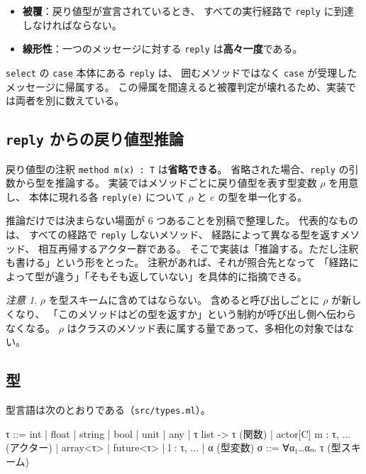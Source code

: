 \documentclass[11pt,a4paper]{ltjsarticle}
\theoremstyle{definition}
\theoremstyle{remark}
\newtheorem{remark}[theorem]{注意}
\begin{document}
\begin{itemize}
\item \textbf{被覆}：戻り値型が宣言されているとき、
      すべての実行経路で \texttt{reply} に到達しなければならない。
\item \textbf{線形性}：一つのメッセージに対する \texttt{reply} は\textbf{高々一度}である。
\end{itemize}

\texttt{select} の \texttt{case} 本体にある \texttt{reply} は、
囲むメソッドではなく \texttt{case} が受理したメッセージに帰属する。
この帰属を間違えると被覆判定が壊れるため、実装では両者を別に数えている。

\subsection{\texttt{reply} からの戻り値型推論}
\label{sec:replytype}

戻り値型の注釈 \texttt{method m(x) : T} は\textbf{省略できる}。
省略された場合、\texttt{reply} の引数から型を推論する。
実装ではメソッドごとに戻り値型を表す型変数 $\rho$ を用意し、
本体に現れる各 \texttt{reply(e)} について $\rho$ と $e$ の型を単一化する。

推論だけでは決まらない場面が 6 つあることを別稿\cite{selfreply}で整理した。
代表的なものは、
すべての経路で \texttt{reply} しないメソッド、
経路によって異なる型を返すメソッド、
相互再帰するアクター群である。
そこで実装は「推論する。ただし注釈も書ける」という形をとった。
注釈があれば、それが照合先となって
「経路によって型が違う」「そもそも返していない」を具体的に指摘できる。

\begin{remark}
$\rho$ を型スキームに含めてはならない。
含めると呼び出しごとに $\rho$ が新しくなり、
「このメソッドはどの型を返すか」という制約が呼び出し側へ伝わらなくなる。
$\rho$ はクラスのメソッド表に属する量であって、多相化の対象ではない。
\end{remark}

\subsection{型}

型言語は次のとおりである（\texttt{src/types.ml}）。

\begin{term}
τ ::= int | float | string | bool | unit | any
    | τ list -> τ                  (関数)
    | actor[C]{ m : τ, ... }        (アクター)
    | array<τ> | future<τ> | { l : τ, ... }
    | α                             (型変数)
σ ::= ∀α₁…αₙ. τ                     (型スキーム)
\end{term}
\end{document}
